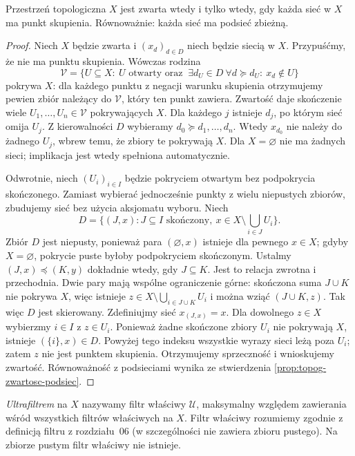 \begin{twierdzenie}
\label{thm:topog-zwartosc-sieci}
Przestrzeń topologiczna $X$ jest zwarta wtedy i tylko
wtedy, gdy każda sieć w $X$ ma punkt skupienia.
Równoważnie: każda sieć ma podsieć zbieżną.
\end{twierdzenie}
\begin{proof}
Niech $X$ będzie zwarta i $(x_d)_{d\in D}$
niech będzie siecią w $X$. Przypuśćmy, że nie ma
punktu skupienia. Wówczas rodzina
\[
\mathcal V=\{U\subseteq X:\ U\text{ otwarty oraz }\
\exists d_U\in D\ \forall d\succeq d_U:\ x_d\notin U\}
\]
pokrywa $X$: dla każdego punktu z negacji warunku
skupienia otrzymujemy pewien zbiór należący do
$\mathcal V$, który ten punkt zawiera.
Zwartość daje skończenie wiele
$U_1,\ldots,U_n\in\mathcal V$ pokrywających $X$.
Dla każdego $j$ istnieje $d_j$, po którym sieć
omija $U_j$. Z kierowalności $D$ wybieramy
$d_0\succeq d_1,\ldots,d_n$.
Wtedy $x_{d_0}$ nie należy do żadnego $U_j$,
wbrew temu, że zbiory te pokrywają $X$.
Dla $X=\varnothing$ nie ma żadnych sieci;
implikacja jest wtedy spełniona automatycznie.

Odwrotnie, niech $(U_i)_{i\in I}$ będzie pokryciem
otwartym bez podpokrycia skończonego.
Zamiast wybierać jednocześnie punkty z wielu
niepustych zbiorów, zbudujemy sieć bez użycia
aksjomatu wyboru. Niech
\[
D=\{(J,x):J\subseteq I\text{ skończony},\
 x\in X\setminus\bigcup_{i\in J}U_i\}.
\]
Zbiór $D$ jest niepusty, ponieważ para
$(\varnothing,x)$ istnieje dla pewnego $x\in X$;
gdyby $X=\varnothing$, pokrycie puste byłoby
podpokryciem skończonym.
Ustalmy $(J,x)\preceq(K,y)$ dokładnie wtedy,
gdy $J\subseteq K$. Jest to relacja zwrotna
i przechodnia. Dwie pary mają wspólne ograniczenie
górne: skończona suma $J\cup K$ nie pokrywa
$X$, więc istnieje $z\in X\setminus
\bigcup_{i\in J\cup K}U_i$ i można wziąć
$(J\cup K,z)$. Tak więc $D$ jest skierowany.
Zdefiniujmy sieć $x_{(J,x)}=x$.
Dla dowolnego $z\in X$ wybierzmy $i\in I$
z $z\in U_i$. Ponieważ żadne skończone
zbiory $U_i$ nie pokrywają $X$, istnieje
$(\{i\},x)\in D$. Powyżej tego indeksu
wszystkie wyrazy sieci leżą poza $U_i$;
zatem $z$ nie jest punktem skupienia.
Otrzymujemy sprzeczność i wnioskujemy zwartość.
Równoważność z podsieciami wynika ze stwierdzenia
\ref{prop:topog-zwartosc-podsiec}.
\end{proof}

\begin{definicja}[Ultrafiltr]
\label{def:topog-zwartosc-ultrafiltr}
\emph{Ultrafiltrem} na $X$ nazywamy filtr właściwy
$\mathcal U$, maksymalny względem zawierania wśród
wszystkich filtrów właściwych na $X$.
Filtr właściwy rozumiemy zgodnie z definicją filtru
z rozdziału~06 (w szczególności nie zawiera zbioru pustego). Na zbiorze pustym filtr właściwy
nie istnieje.
\end{definicja}

